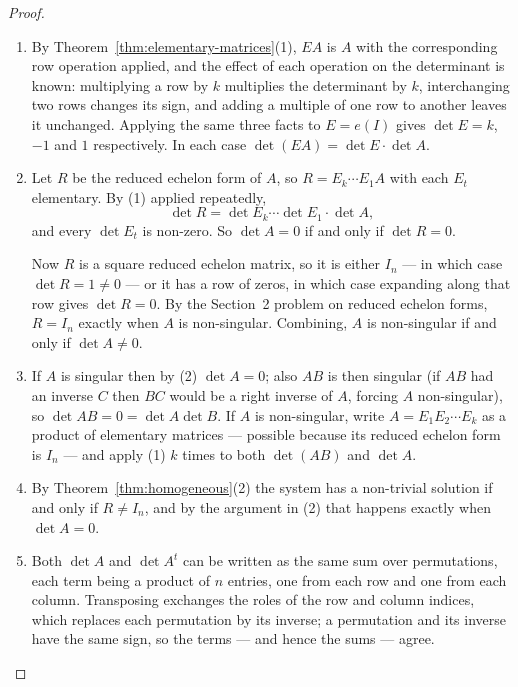 \documentclass[11pt,a4paper]{article}
\theoremstyle{definition}
\begin{document}
\begin{proof}
\begin{enumerate}
\item By Theorem~\ref{thm:elementary-matrices}(1), $EA$ is $A$ with the
corresponding row operation applied, and the effect of each operation on the
determinant is known: multiplying a row by $k$ multiplies the determinant by
$k$, interchanging two rows changes its sign, and adding a multiple of one row
to another leaves it unchanged. Applying the same three facts to $E=e(I)$ gives
$\det E=k$, $-1$ and $1$ respectively. In each case $\det(EA)=\det E\cdot\det
A$.

\item Let $R$ be the reduced echelon form of $A$, so $R=E_k\cdots E_1A$ with
each $E_t$ elementary. By (1) applied repeatedly,
$$\det R=\det E_k\cdots\det E_1\cdot\det A,$$
and every $\det E_t$ is non-zero. So $\det A=0$ if and only if $\det R=0$.

Now $R$ is a square reduced echelon matrix, so it is either $I_n$ --- in which
case $\det R=1\neq 0$ --- or it has a row of zeros, in which case expanding
along that row gives $\det R=0$. By the Section~2 problem on reduced echelon
forms, $R=I_n$ exactly when $A$ is non-singular. Combining, $A$ is non-singular
if and only if $\det A\neq 0$.

\item If $A$ is singular then by (2) $\det A=0$; also $AB$ is then singular
(if $AB$ had an inverse $C$ then $BC$ would be a right inverse of $A$, forcing
$A$ non-singular), so $\det AB=0=\det A\det B$. If $A$ is non-singular, write
$A=E_1E_2\cdots E_k$ as a product of elementary matrices --- possible because
its reduced echelon form is $I_n$ --- and apply (1) $k$ times to both
$\det(AB)$ and $\det A$.

\item By Theorem~\ref{thm:homogeneous}(2) the system has a non-trivial solution
if and only if $R\neq I_n$, and by the argument in (2) that happens exactly
when $\det A=0$.

\item Both $\det A$ and $\det A^t$ can be written as the same sum over
permutations, each term being a product of $n$ entries, one from each row and
one from each column. Transposing exchanges the roles of the row and column
indices, which replaces each permutation by its inverse; a permutation and its
inverse have the same sign, so the terms --- and hence the sums --- agree.
\end{enumerate}
\end{proof}
\end{document}
